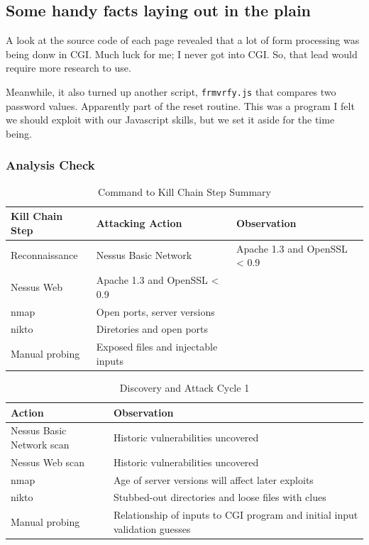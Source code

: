 \subsection{Some handy facts laying out in the plain}
A look at the source code of each page revealed that a lot of form processing was being donw in CGI.  Much luck for me; I never got into CGI.  So, that lead would require more research to use.  


Meanwhile, it also turned up another script, \texttt{frmvrfy.js} that compares two password values.  Apparently part of the reset routine.  This was a program I felt we should exploit with our Javascript skills, but we set it aside for the time being.  

\subsubsection{Analysis Check}
\begin{table}[H]
\caption{Command to Kill Chain Step Summary}
\centering
\begin{tabular}{|l|l|l|}
\hline
Kill Chain Step & Attacking Action & Observation \\
\hline
Reconnaissance & Nessus Basic Network & Apache 1.3 and OpenSSL < 0.9 \\
Nessus Web & Apache 1.3 and OpenSSL < 0.9 &  \\
nmap & Open ports, server versions &  \\
nikto & Diretories and open ports &  \\
Manual probing & Exposed files and injectable inputs &  \\
\hline
\end{tabular}
\end{table}

\begin{table}[H]
\caption{Discovery and Attack Cycle 1}
\centering
\begin{tabular}{|l|l|}
\hline
Action & Observation \\
\hline
Nessus Basic Network scan & Historic vulnerabilities uncovered \\
Nessus Web scan & Historic vulnerabilities uncovered \\
nmap & Age of server versions will affect later exploits \\
nikto & Stubbed-out directories and loose files with clues \\
Manual probing & Relationship of inputs to CGI program and initial input validation guesses \\
\hline
\end{tabular}
\end{table}

